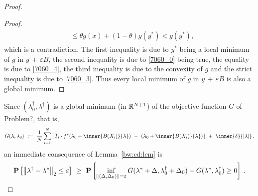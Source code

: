 \begin{proof}
\begin{proof}
\begin{align}
\begin{split}
      &\le
      \theta g(x)
      + 
      (1 - \theta)
      g(y^*)
      <
      g(y^*)
      ,
      \end{split}
    \end{align}
    which is a contradiction.
    The first inequality is due to
    $y^*$ being a local minimum of $g$ in
    $
  y
  \,
  +
  \,
  \varepsilon
  B
    $,
    the second inequality is due to  
    \eqref{7060_0} being true,
    the equality is due to \eqref{7060_4},
    the third inequality is due to the convexity of $g$
    and the strict inequality is due to \eqref{7060_3}.
    Thus every local minimum of $g$ in
    $
  y
  \,
  +
  \,
  \varepsilon
  B
    $
    is also a global minimum.
\end{proof}
Since 
$
(\lambda_0^\dagger,\lambda^\dagger)
$
is a global minimum (in $\mathbb{R}^{N+1}$) of the 
objective function $G$ of Problem?, that is,
\begin{gather*}
  G(\lambda,\lambda_0)
  \ 
  :=
  \ 
    \frac{1}{N}
\sum_{i=1} 
  ^N
  \left[ 
    \,
  T_i
  \cdot
  f^*
  \!
  \left( 
\lambda_0
+
\inner
{B(X_i)}
{\lambda}
  \right)
  \ 
-
\ 
  \left( 
\lambda_0
+
\inner
{B(X_i)}
{\lambda}
  \right)
  \,
  \right]
  \ 
+
\ 
\inner
{\delta}
{|\lambda|}
\,.
\end{gather*}
an immediate consequence of Lemma~\ref{bw:cd:lem} is
\begin{gather*}
   \P
   \left[ 
     \norm
     {
      \lambda ^ \dagger
      -
      \lambda^*
     }_2
     \le
     \varepsilon
   \right]
   \
   \ge
   \ 
   \P
   \left[ 
     \inf _ { 
       \norm{
         (
     \Delta
     ,
     \Delta_0
         )
 } 
= \varepsilon }
     G
     (
     \lambda^*
      +
      \Delta
      ,
      \lambda^\dagger_0
      +
     \Delta_0
     )
     -
     G
     (
     \lambda^*,
      \lambda^\dagger_0
     )
     \ge 
     0
   \right]
   \,.
 \end{gather*}


\end{proof}
